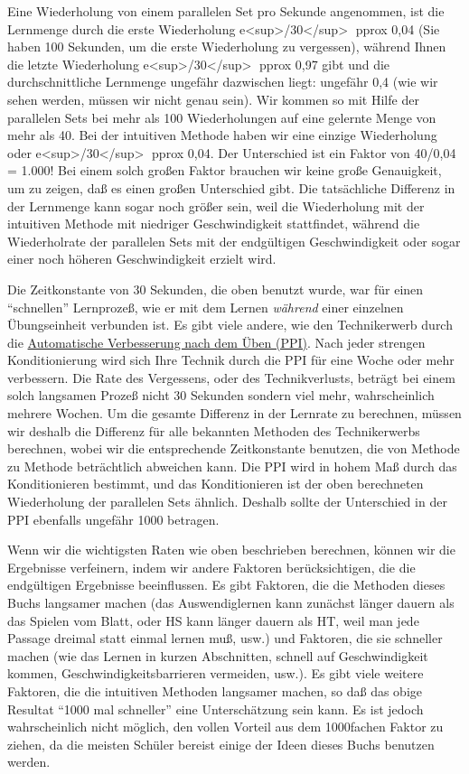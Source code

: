 Eine Wiederholung von einem parallelen Set pro Sekunde angenommen, ist die Lernmenge durch die erste Wiederholung e<sup>/30</sup> pprox 0,04 (Sie haben 100 Sekunden, um die erste Wiederholung zu vergessen), während Ihnen die letzte Wiederholung e<sup>/30</sup> pprox 0,97 gibt und die durchschnittliche Lernmenge ungefähr dazwischen liegt: ungefähr 0,4 (wie wir sehen werden, müssen wir nicht genau sein). Wir kommen so mit Hilfe der parallelen Sets bei mehr als 100 Wiederholungen auf eine gelernte Menge von mehr als 40.
Bei der intuitiven Methode haben wir eine einzige Wiederholung oder e<sup>/30</sup> pprox 0,04.
Der Unterschied ist ein Faktor von 40/0,04 = 1.000!
Bei einem solch großen Faktor brauchen wir keine große Genauigkeit, um zu zeigen, daß es einen großen Unterschied gibt.
Die tatsächliche Differenz in der Lernmenge kann sogar noch größer sein, weil die Wiederholung mit der intuitiven Methode mit niedriger Geschwindigkeit stattfindet, während die Wiederholrate der parallelen Sets mit der endgültigen Geschwindigkeit oder sogar einer noch höheren Geschwindigkeit erzielt wird.

Die Zeitkonstante von 30 Sekunden, die oben benutzt wurde, war für einen \enquote{schnellen} Lernprozeß, wie er mit dem Lernen \textit{während} einer einzelnen Übungseinheit verbunden ist.
Es gibt viele andere, wie den Technikerwerb durch die \hyperref[c1ii15]{Automatische Verbesserung nach dem Üben (PPI)}.
Nach jeder strengen Konditionierung wird sich Ihre Technik durch die PPI für eine Woche oder mehr verbessern.
Die Rate des Vergessens, oder des Technikverlusts, beträgt bei einem solch langsamen Prozeß nicht 30 Sekunden sondern viel mehr, wahrscheinlich mehrere Wochen.
Um die gesamte Differenz in der Lernrate zu berechnen, müssen wir deshalb die Differenz für alle bekannten Methoden des Technikerwerbs berechnen, wobei wir die entsprechende Zeitkonstante benutzen, die von Methode zu Methode beträchtlich abweichen kann.
Die PPI wird in hohem Maß durch das Konditionieren bestimmt, und das Konditionieren ist der oben berechneten Wiederholung der parallelen Sets ähnlich.
Deshalb sollte der Unterschied in der PPI ebenfalls ungefähr 1000 betragen.

Wenn wir die wichtigsten Raten wie oben beschrieben berechnen, können wir die Ergebnisse verfeinern, indem wir andere Faktoren berücksichtigen, die die endgültigen Ergebnisse beeinflussen.
Es gibt Faktoren, die die Methoden dieses Buchs langsamer machen (das Auswendiglernen kann zunächst länger dauern als das Spielen vom Blatt, oder HS kann länger dauern als HT, weil man jede Passage dreimal statt einmal lernen muß, usw.) und Faktoren, die sie schneller machen (wie das Lernen in kurzen Abschnitten, schnell auf Geschwindigkeit kommen, Geschwindigkeitsbarrieren vermeiden, usw.).
Es gibt viele weitere Faktoren, die die intuitiven Methoden langsamer machen, so daß das obige Resultat \enquote{1000 mal schneller} eine Unterschätzung sein kann.
Es ist jedoch wahrscheinlich nicht möglich, den vollen Vorteil aus dem 1000fachen Faktor zu ziehen, da die meisten Schüler bereist einige der Ideen dieses Buchs benutzen werden.


